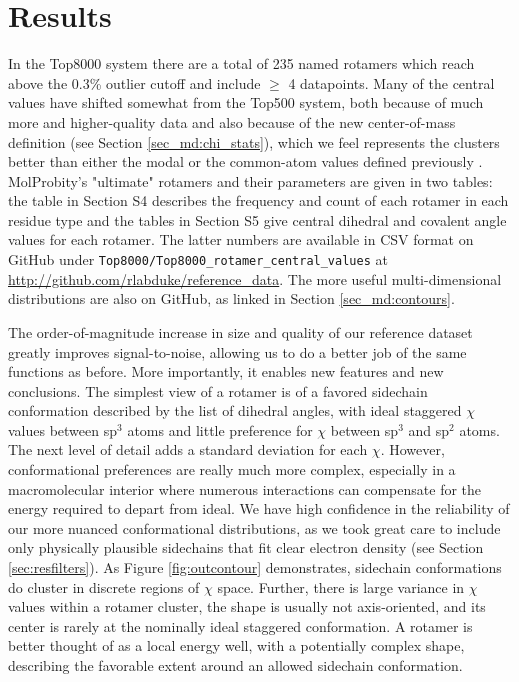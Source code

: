 \section{Results}
In the Top8000 system there are a total of 235 named rotamers which reach above the 0.3\% outlier cutoff and include $\ge$ 4 datapoints. Many of the central values have shifted somewhat from the Top500 system, both because of much more and higher-quality data and also because of the new center-of-mass definition (see Section \ref{sec_md:chi_stats}), which we feel represents the clusters better than either the modal or the common-atom values defined previously \cite{lovell2000penultimate}. MolProbity's "ultimate" rotamers and their parameters are given in two tables: the table in Section S4 describes the frequency and count of each rotamer in each residue type and the tables in Section S5 give central dihedral and covalent angle values for each rotamer. The latter numbers are available in CSV format on GitHub under \texttt{Top8000/Top8000\_rotamer\_central\_values} at \url{http://github.com/rlabduke/reference_data}. The more useful multi-dimensional distributions are also on GitHub, as linked in Section \ref{sec_md:contours}.

The order-of-magnitude increase in size and quality of our reference dataset greatly improves signal-to-noise, allowing us to do a better job of the same functions as before. More importantly, it enables new features and new conclusions. The simplest view of a rotamer is of a favored sidechain conformation described by the list of dihedral angles, with ideal staggered $\chi$ values between sp$^{3}$ atoms and little preference for $\chi$ between sp$^{3}$ and sp$^{2}$ atoms. The next level of detail adds a standard deviation for each $\chi$. However, conformational preferences are really much more complex, especially in a macromolecular interior where numerous interactions can compensate for the energy required to depart from ideal. We have high confidence in the reliability of our more nuanced conformational distributions, as we took great care to include only physically plausible sidechains that fit clear electron density (see Section \ref{sec:resfilters}). As Figure \ref{fig:outcontour} demonstrates, sidechain conformations do cluster in discrete regions of $\chi$ space. Further, there is large variance in $\chi$ values within a rotamer cluster, the shape is usually not axis-oriented, and its center is rarely at the nominally ideal staggered conformation. A rotamer is better thought of as a local energy well, with a potentially complex shape, describing the favorable extent around an allowed sidechain conformation.

